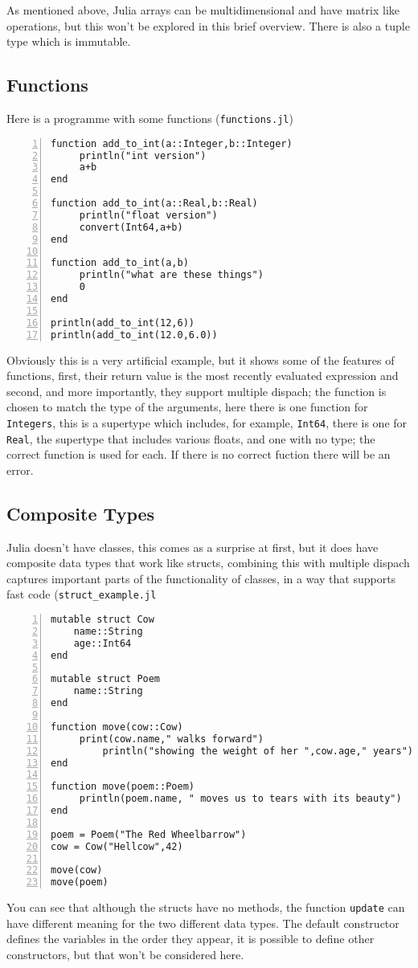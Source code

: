 \documentclass[11pt,a4paper]{scrartcl}
\begin{document}
As mentioned above, Julia arrays can be multidimensional and have
matrix like operations, but this won't be explored in this brief
overview. There is also a tuple type which is immutable.

\subsection*{Functions}
Here is a programme with some functions (\texttt{functions.jl})
\begin{lstlisting}[numbers=left]
function add_to_int(a::Integer,b::Integer)
	 println("int version")
	 a+b
end

function add_to_int(a::Real,b::Real)
	 println("float version")
	 convert(Int64,a+b)
end

function add_to_int(a,b)
	 println("what are these things")
	 0
end

println(add_to_int(12,6))
println(add_to_int(12.0,6.0))
\end{lstlisting}
Obviously this is a very artificial example, but it shows some of the
features of functions, first, their return value is the most recently
evaluated expression and second, and more importantly, they support
multiple dispach; the function is chosen to match the type of the
arguments, here there is one function for \texttt{Integers}, this is a
supertype which includes, for example, \texttt{Int64}, there is one
for \texttt{Real}, the supertype that includes various floats, and one
with no type; the correct function is used for each. If there is no
correct fuction there will be an error.

\subsection*{Composite Types}
Julia doesn't have classes, this comes as a surprise at first, but it
does have composite data types that work like structs, combining this
with multiple dispach captures important parts of the functionality of
classes, in a way that supports fast code (\texttt{struct\_example.jl}
\begin{lstlisting}[numbers=left]
mutable struct Cow
	name::String
	age::Int64
end

mutable struct Poem
	name::String
end	

function move(cow::Cow)
	 print(cow.name," walks forward") 
         println("showing the weight of her ",cow.age," years")
end

function move(poem::Poem)
	 println(poem.name, " moves us to tears with its beauty")
end

poem = Poem("The Red Wheelbarrow")
cow = Cow("Hellcow",42)

move(cow)
move(poem)
\end{lstlisting}
You can see that although the structs have no methods, the function
\texttt{update} can have different meaning for the two different data
types. The default constructor defines the variables in the order they
appear, it is possible to define other constructors, but that won't be
considered here.
\end{document}
